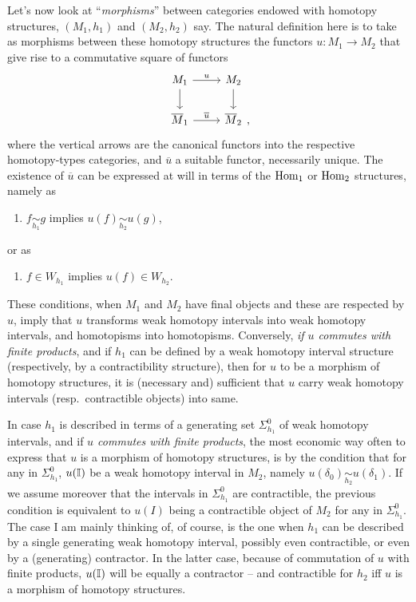 \label{sec:55}%
Let's now look at ``\emph{morphisms}'' between categories endowed with
homotopy structures, $(M_1,h_1)$ and $(M_2,h_2)$ say. The natural
definition here is to take as morphisms between these homotopy
structures the functors $u:M_1\to M_2$ that give rise to a commutative
square of functors
\[\begin{tikzcd}[baseline=(O.base)]
  M_1 \ar[r,"u"]\ar[d] & M_2\ar[d] \\
  \overline M_1 \ar[r,"\overline u"] & |[alias=O]| \overline M_2
\end{tikzcd},\]
where the vertical arrows are the canonical functors into the
respective homotopy-types categories, and $\overline u$ a suitable
functor, necessarily unique.
The existence of $\overline u$ can be expressed at will in terms of
the $\operatorname{Hom}_1$ or $\operatorname{Hom}_2$ structures, namely as
\begin{enumerate}[label=(\roman*)]
\item\label{it:55.i}
  $f \underset{h_1}\sim g$ implies $u(f) \underset{h_2}\sim u(g)$,
\end{enumerate}
or as
\begin{enumerate}[label=(\roman*),resume]
\item\label{it:55.ii}
  $f\in W_{h_1}$ implies $u(f)\in W_{h_2}$.
\end{enumerate}
These conditions, when $M_1$ and $M_2$ have final objects and these
are respected by $u$, imply that $u$ transforms weak homotopy
intervals into weak homotopy intervals, and homotopisms into
homotopisms. Conversely, \emph{if $u$ commutes with finite products},
and if $h_1$ can be defined by a weak homotopy interval structure
(respectively, by a contractibility structure), then for $u$ to be a
morphism of homotopy structures, it is (necessary and) sufficient that
$u$ carry weak homotopy intervals (resp.\ contractible objects) into
same.

In case $h_1$ is described in terms of a generating set
$\Sigma_{h_1}^0$ of weak homotopy intervals, and if \emph{$u$ commutes
  with finite products}, the most economic way often to express that
$u$ is a morphism of homotopy structures, is by the condition that for
any \bI{} in $\Sigma_{h_1}^0$, $u({\mathbb{I}})$ be a weak homotopy
interval in $M_2$, namely $u(\delta_0) \underset{h_2}\sim
u(\delta_1)$. If we assume moreover that the intervals \bI{} in
$\Sigma_{h_1}^0$ are contractible, the previous condition is
equivalent to $u(I)$ being a contractible object of $M_2$ for any
\bI{} in $\Sigma_{h_1}^0$. The case I am mainly thinking of, of
course, is the one when $h_1$ can be described by a single generating
weak homotopy interval, possibly even contractible, or even by a
(generating) contractor. In the latter case, because of commutation of
$u$ with finite products, $u({\mathbb{I}})$ will be equally a contractor -- and
contractible for $h_2$ if{f} $u$ is a morphism of homotopy structures.

